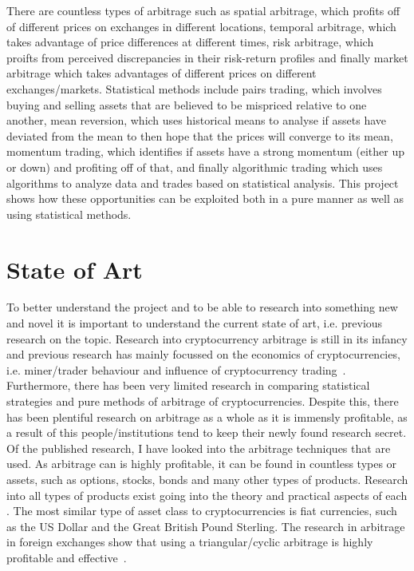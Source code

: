 There are countless types of arbitrage such as spatial arbitrage, which profits off of different prices on exchanges in different locations, temporal arbitrage, which takes advantage of price differences at different times, risk arbitrage, which proifts from perceived discrepancies in their risk-return profiles and finally market arbitrage which takes advantages of different prices on different exchanges/markets. Statistical methods include pairs trading, which involves buying and selling assets that are believed to be mispriced relative to one another, mean reversion, which uses historical means to analyse if assets have deviated from the mean to then hope that the prices will converge to its mean, momentum trading, which identifies if assets have a strong momentum (either up or down) and profiting off of that, and finally algorithmic trading which uses algorithms to analyze data and trades based on statistical analysis. This project shows how these opportunities can be exploited both in a pure manner as well as using statistical methods.

\section{State of Art}
To better understand the project and to be able to research into something new and novel it is important to understand the current state of art, i.e. previous research on the topic. Research into cryptocurrency arbitrage is still in its infancy and previous research has mainly focussed on the economics of cryptocurrencies, i.e. miner/trader behaviour and influence of cryptocurrency trading~\cite{eyal2015miner, avarikioti2020ride, huberman2021monopoly, athey2016bitcoin, easley2019mining, harvey2016cryptofinance, pagnotta2018equilibrium}. Furthermore, there has been very limited research in comparing statistical strategies and pure methods of arbitrage of cryptocurrencies. Despite this, there has been plentiful research on arbitrage as a whole as it is immensly profitable, as a result of this people/institutions tend to keep their newly found research secret. Of the published research, I have looked into the arbitrage techniques that are used. As arbitrage can is highly profitable, it can be found in countless types or assets, such as options, stocks, bonds and many other types of products. Research into all types of products exist going into the theory and practical aspects of each \cite{mo_theoretical_nodate, 8957853}. The most similar type of asset class to cryptocurrencies is fiat currencies, such as the US Dollar and the Great British Pound Sterling. The research in arbitrage in foreign exchanges show that using a triangular/cyclic arbitrage is highly profitable and effective~\cite{akram2008arbitrage, aiba2002triangular, ito2012free}. 

